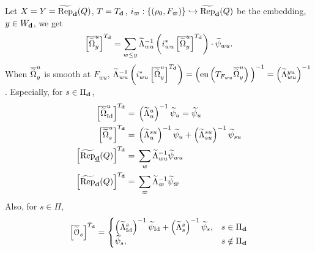\begin{eg}
Let $X=Y=\operatorname{\widetilde{\operatorname{Rep}}}_{\mathbf{d}}(Q)$, $T=T_{\mathbf{d}}$, $i_{\varpi}: \{(\rho_0, F_{\varpi})\} \hookrightarrow \operatorname{\widetilde{\operatorname{Rep}}}_{\mathbf{d}}(Q)$ be the embedding, $y \in W_{\mathbf{d}}$, we get
$$\left[  \overline{\widetilde{\Omega}}_{y}^{u} \right]^{T_{\mathbf{d}}}= \sum_{w \leq y} \widetilde{\Lambda}_{wu}^{-1}\left(  i_{wu}^{*} \left[  \overline{\widetilde{\Omega}}_y^{u} \right]^{T_{\mathbf{d}}} \right) \cdot \widetilde{\psi}_{wu}.$$
When $\overline{\widetilde{\Omega}}_{y}^{u}$ is smooth at $F_{wu}$, $\preimage{\Lambda}_{wu}^{-1}\left(  i_{wu}^{*} \left[  \overline{\preimage{\Omcell}}_y^{u} \right]^{T_{\dimvec{d}}} \right) = \left( \eu \left( T_{F_{wu}} \overline{\preimage{\Omcell}}_{y}^{u}  \right)\rule{0mm}{4mm} \right)^{-1} = \left(\preimage{\Lambda}_{wu}^{yu}\right)^{-1}$. Especially, for $s \in \Pi_{\mathbf{d}}$,
\begin{equation*}
\begin{aligned}
  \left[  \overline{\widetilde{\Omega}}_{\operatorname{\operatorname{Id}}}^{u} \right]^{T_{\mathbf{d}}}=\;&  \left( \widetilde{\Lambda}_{u}^{u}  \right)^{-1} \widetilde{\psi}_{u}=\widetilde{\psi}_{u} \\
  \left[  \overline{\widetilde{\Omega}}_{s}^{u} \right]^{T_{\mathbf{d}}}=\;&  \left( \widetilde{\Lambda}_{u}^{su}  \right)^{-1} \widetilde{\psi}_{u} + \left( \widetilde{\Lambda}_{su}^{su}  \right)^{-1} \widetilde{\psi}_{su} \\
  \left[  \operatorname{\widetilde{\operatorname{Rep}}}_{\underline{\mathbf{d}}}(Q) \right]^{T_{\mathbf{d}}}=\;&  \sum_{w} \widetilde{\Lambda}_{wu}^{-1} \widetilde{\psi}_{wu} \\
  \left[  \operatorname{\widetilde{\operatorname{Rep}}}_{\mathbf{d}}(Q) \right]^{T_{\mathbf{d}}}=\;&  \sum_{\varpi} \widetilde{\Lambda}_{\varpi}^{-1} \widetilde{\psi}_{\varpi} \\  
\end{aligned}
\end{equation*}
Also, for $s \in \Pi$,
$$
\left[  \overline{\widetilde{\mathcal{O}}}_s \right]^{T_{\mathbf{d}}}=
\begin{cases}
\left( \widetilde{\Lambda}_{\operatorname{\operatorname{Id}}}^{s}  \right)^{-1} \widetilde{\psi}_{\operatorname{\operatorname{Id}}} + \left( \widetilde{\Lambda}_{s}^{s}  \right)^{-1} \widetilde{\psi}_{s}, &s \in \Pi_{\mathbf{d}}\\
\widetilde{\psi}_{s}, &s \notin \Pi_{\mathbf{d}}
\end{cases}
$$
\end{eg}

